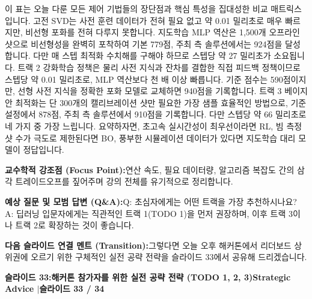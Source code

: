 \documentclass[11pt,a4paper]{article}
\begin{document}
\begin{tcolorbox}[colback=white,colframe=primaryblue,title={\footnotesize\bfseries\color{white}발표자 구두 대본 (Spoken Script)},fontupper=\small,left=6pt,right=6pt,top=3pt,bottom=3pt,boxrule=0.8pt,arc=2.5pt]
이 표는 오늘 다룬 모든 제어 기법들의 장단점과 핵심 특성을 집대성한 비교 매트릭스입니다. 고전 SVD는 사전 훈련 데이터가 전혀 필요 없고 약 0.01 밀리초로 매우 빠르지만, 비선형 포화를 전혀 다루지 못합니다. 지도학습 MLP 역산은 1,500개 오프라인 샷으로 비선형성을 완벽히 포착하여 기본 779점, 주최 측 솔루션에서는 924점을 달성합니다. 다만 매 스텝 최적화 수치해를 구해야 하므로 스텝당 약 27 밀리초가 소요됩니다. 트랙 2 강화학습 정책은 물리 사전 지식과 잔차를 결합한 직접 피드백 정책이므로 스텝당 약 0.01 밀리초로, MLP 역산보다 천 배 이상 빠릅니다. 기준 점수는 590점이지만, 선형 사전 지식을 정확한 포화 모델로 교체하면 940점을 기록합니다. 트랙 3 베이지안 최적화는 단 300개의 캘리브레이션 샷만 필요한 가장 샘플 효율적인 방법으로, 기준 설정에서 878점, 주최 측 솔루션에서 910점을 기록합니다. 다만 스텝당 약 66 밀리초로 네 가지 중 가장 느립니다. 요약하자면, 초고속 실시간성이 최우선이라면 RL, 빔 측정 샷 수가 극도로 제한된다면 BO, 풍부한 시뮬레이션 데이터가 있다면 지도학습 대리 모델이 정답입니다.
\end{tcolorbox}
\vspace{0.2em}
\begin{tcolorbox}[colback=lightbg,colframe=bordergray,left=6pt,right=6pt,top=3pt,bottom=3pt,boxrule=0.6pt,arc=2.5pt]
\small
\noindent\textbf{\color{navy}교수학적 강조점 (Focus Point):}\enspace 연산 속도, 필요 데이터량, 알고리즘 복잡도 간의 삼각 트레이드오프를 짚어주며 강의 전체를 유기적으로 정리합니다.\par\vspace{0.3em}
\noindent\textbf{\color{successgreen}예상 질문 및 모범 답변 (Q\&A):}\enspace Q: 초심자에게는 어떤 트랙을 가장 추천하시나요? A: 딥러닝 입문자에게는 직관적인 트랙 1(TODO 1)을 먼저 권장하며, 이후 트랙 3이나 트랙 2로 확장하는 것이 좋습니다.\par\vspace{0.3em}
\noindent\textbf{\color{accent}다음 슬라이드 연결 멘트 (Transition):}\enspace 그렇다면 오늘 오후 해커톤에서 리더보드 상위권에 오르기 위한 구체적인 실전 공략 전략을 슬라이드 33에서 공유해 드리겠습니다.
\end{tcolorbox}
\clearpage
\hypertarget{slide.33}{}
{}
\noindent\begin{tcolorbox}[colback=navy,colframe=navy,left=6pt,right=6pt,top=3pt,bottom=3pt,boxrule=0pt,arc=2pt]
{\large\bfseries\color{white}슬라이드 33:\enspace 해커톤 참가자를 위한 실전 공략 전략 (TODO 1, 2, 3)}\hfill{\footnotesize\bfseries\color{white!85!lightbg}Strategic Advice \enspace$|$\enspace 슬라이드 33 / 34}
\end{tcolorbox}
\end{document}

